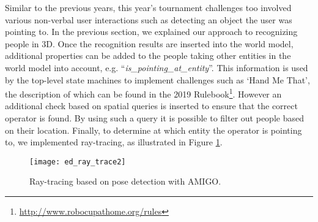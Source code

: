 Similar to the previous years, this year’s tournament challenges too involved various non-verbal user interactions such as detecting an object the user was pointing to. In the previous section, we explained our approach to recognizing people in 3D. 
Once the recognition results are inserted into the world model, additional properties can be added to the people taking other entities in the world model into account, e.g. “\emph{is\_pointing\_at\_entity}”. This information is used by the top-level state machines to implement challenges such as `Hand Me That', the description of which can be found in the 2019 Rulebook\footnote{\url{http://www.robocupathome.org/rules}}. However an additional check based on spatial queries is inserted to ensure that the correct operator is found. By using such a query it is possible to filter out people based on their location. Finally, to determine at which entity the operator is pointing to, we implemented ray-tracing, as illustrated in Figure \ref{fig:ray_trace}.

\begin{figure}[H]
	\centering
    \texttt{[image: ed\_ray\_trace2]}
	\caption{Ray-tracing based on pose detection with AMIGO.}
	\label{fig:ray_trace}
\end{figure}


